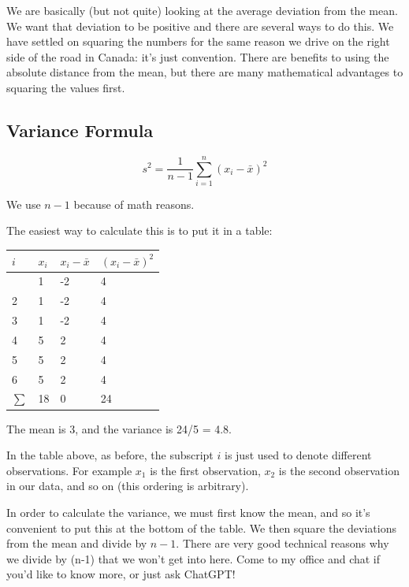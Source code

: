 \documentclass[
  letterpaper,
  DIV=11,
  numbers=noendperiod,
  oneside]{scrreprt}
\begin{document}
We are basically (but not quite) looking at the average deviation from
the mean. We want that deviation to be positive and there are several
ways to do this. We have settled on squaring the numbers for the same
reason we drive on the right side of the road in Canada: it's just
convention. There are benefits to using the absolute distance from the
mean, but there are many mathematical advantages to squaring the values
first.

\hypertarget{variance-formula}{%
\subsection{Variance Formula}\label{variance-formula}}

\vspace{1.5cm}

\[
s^2 = \frac{1}{n-1}\sum_{i=1}^n(x_i - \bar x)^2
\]

We use \(n-1\) because of math reasons.

The easiest way to calculate this is to put it in a table:

\begin{longtable}[]{@{}llll@{}}
\toprule\noalign{}
\(i\) & \(x_i\) & \(x_i - \bar x\) & \((x_i - \bar x)^2\) \\
\midrule\noalign{}
\endhead
\bottomrule\noalign{}
\endlastfoot
1 & 1 & -2 & 4 \\
2 & 1 & -2 & 4 \\
3 & 1 & -2 & 4 \\
4 & 5 & 2 & 4 \\
5 & 5 & 2 & 4 \\
6 & 5 & 2 & 4 \\
\(\sum\) & 18 & 0 & 24 \\
\end{longtable}

The mean is 3, and the variance is 24/5 = 4.8.

In the table above, as before, the subscript \(i\) is just used to
denote different observations. For example \(x_1\) is the first
observation, \(x_2\) is the second observation in our data, and so on
(this ordering is arbitrary).

In order to calculate the variance, we must first know the mean, and so
it's convenient to put this at the bottom of the table. We then square
the deviations from the mean and divide by \(n-1\). There are very good
technical reasons why we divide by (n-1) that we won't get into here.
Come to my office and chat if you'd like to know more, or just ask
ChatGPT!
\end{document}
